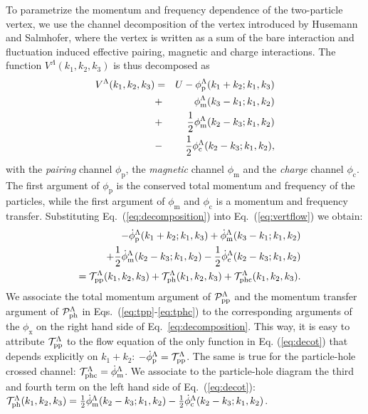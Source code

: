 To parametrize the momentum and frequency dependence of the two-particle vertex, we use the channel decomposition of the vertex introduced by Husemann and Salmhofer, \cite{Husemann2009} where the vertex is written as a sum of the bare interaction and fluctuation induced effective pairing, magnetic and charge interactions.
The function $V^\Lambda(k_1,k_2,k_3)$ is thus decomposed as
\begin{eqnarray}
\nonumber
V^{\Lambda}(k_1,k_2,k_3)&=& U - \phi^{\Lambda}_{\mathrm{p}}(k_1+k_2;k_1,k_3)  \\
&+& \phi^{\Lambda}_{\mathrm{m}}(k_3-k_1;k_1,k_2)  \nonumber
 \\ 
 &+&
  \frac{1}{2}  \phi^{\Lambda}_{\mathrm{m}}(k_2- k_3;k_1,k_2) \nonumber \\ & -& \frac{1}{2} \phi^{\Lambda}_{\mathrm{c}}(k_2-k_3;k_1,k_2),
 \label{eq:decomposition}
\end{eqnarray}
with the {\em pairing} channel $\phi_{\mathrm{p}}$, the {\em magnetic} channel $\phi_{\mathrm{m}}$ and the {\em charge} channel $\phi_{\mathrm{c}}$. The first argument of $\phi_{\mathrm{p}}$ is the conserved total momentum and frequency of the particles, while the first argument of $\phi_{\mathrm{m}}$ and $\phi_{\mathrm{c}}$ is a momentum and frequency transfer.
Substituting Eq.~(\ref{eq:decomposition}) into Eq.~(\ref{eq:vertflow}) we obtain: 
\begin{eqnarray}
\nonumber
&&-\dot \phi^{\Lambda}_{\mathrm{p}}(k_1+k_2;k_1,k_3)+ \dot \phi^{\Lambda}_{\mathrm{m}}(k_3-k_1;k_1,k_2)\\&& 
 + \frac{1}{2}  \dot\phi^{\Lambda}_{\mathrm{m}}(k_2- k_3;k_1,k_2)- \frac{1}{2} \dot\phi^{\Lambda}_{\mathrm{c}}(k_2-k_3;k_1,k_2)\\&&=
   \mathcal{T}^{\Lambda}_{\mathrm{pp} }(k_1,k_2,k_3) +  
  \mathcal{T}^{\Lambda}_{\mathrm{ph} }(k_1,k_2,k_3) + 
  \mathcal{T}^{\Lambda}_{\mathrm{phc} }(k_1,k_2,k_3).
  \nonumber
\label{eq:decot}
\end{eqnarray} 
We associate the total momentum argument of $\mathcal{P}^\Lambda_{\rm pp}$ and the momentum transfer argument of $\mathcal{P}^\Lambda_{\rm ph}$ in Eqs.~(\ref{eq:tpp}-\ref{eq:tphc}) to the corresponding arguments of the $\phi_{\mathrm{x}}$ on the right hand side of Eq.~\ref{eq:decomposition}.
This way, it is easy to attribute $\mathcal{T}^{\Lambda}_{\mathrm{pp} }$ to the flow equation of the only function in Eq. (\ref{eq:decot}) that depends explicitly on $k_1+k_2$: $-\dot\phi_{\mathrm{p}}^\Lambda=\mathcal{T}^{\Lambda}_{\mathrm{pp} }$. 
The same is true for the particle-hole crossed channel: $\mathcal{T}^{\Lambda}_{\mathrm{phc} }=\dot\phi_{\mathrm{m}}^\Lambda$.  We associate to the particle-hole diagram the third and fourth term on the left hand side of Eq.~(\ref{eq:decot}): $\mathcal{T}^{\Lambda}_{\mathrm{ph} }(k_1,k_2,k_3)=\frac{1}{2}  \dot\phi^{\Lambda}_{\mathrm{m}}(k_2- k_3;k_1,k_2) - \frac{1}{2} \dot\phi^{\Lambda}_{\mathrm{c}}(k_2-k_3;k_1,k_2) $.  
